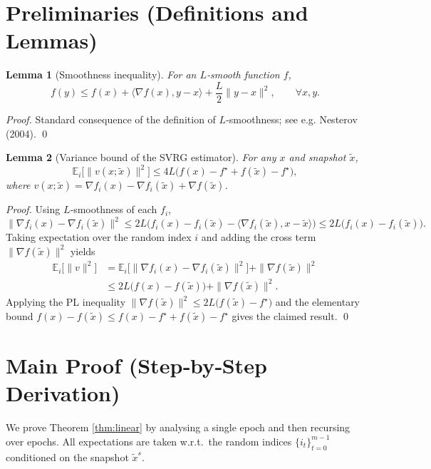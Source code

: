 \documentclass{article}
\newtheorem{lemma}{Lemma}[section]
\begin{document}
\section*{Preliminaries (Definitions and Lemmas)}
\begin{lemma}[Smoothness inequality]\label{lem:smooth}
For an $L$‑smooth function $f$,
\[
f(y)\le f(x)+\langle\nabla f(x),y-x\rangle+\frac{L}{2}\|y-x\|^{2},
\qquad\forall x,y .
\]
\end{lemma}
\begin{proof}
Standard consequence of the definition of $L$‑smoothness; see e.g. Nesterov (2004). \hfill\qed
\end{proof}

\begin{lemma}[Variance bound of the SVRG estimator]\label{lem:var}
For any $x$ and snapshot $\tilde{x}$,
\[
\mathbb{E}_{i}\!\bigl[\|v(x;\tilde{x})\|^{2}\bigr]
\le 4L\bigl(f(x)-f^{\star}+f(\tilde{x})-f^{\star}\bigr),
\]
where $v(x;\tilde{x})=\nabla f_{i}(x)-\nabla f_{i}(\tilde{x})+\nabla f(\tilde{x})$.
\end{lemma}
\begin{proof}
Using $L$‑smoothness of each $f_i$,
\[
\|\nabla f_i(x)-\nabla f_i(\tilde{x})\|^{2}
\le 2L\bigl(f_i(x)-f_i(\tilde{x})-\langle\nabla f_i(\tilde{x}),x-\tilde{x}\rangle\bigr)
\le 2L\bigl(f_i(x)-f_i(\tilde{x})\bigr).
\]
Taking expectation over the random index $i$ and adding the cross term
$\|\nabla f(\tilde{x})\|^{2}$ yields
\[
\begin{aligned}
\mathbb{E}_{i}\!\bigl[\|v\|^{2}\bigr]
&= \mathbb{E}_{i}\!\bigl[\|\nabla f_i(x)-\nabla f_i(\tilde{x})\|^{2}\bigr]
   +\|\nabla f(\tilde{x})\|^{2} \\
&\le 2L\bigl(f(x)-f(\tilde{x})\bigr)+\|\nabla f(\tilde{x})\|^{2}.
\end{aligned}
\]
Applying the PL inequality $\|\nabla f(\tilde{x})\|^{2}\le 2L\bigl(f(\tilde{x})-f^{\star}\bigr)$
and the elementary bound $f(x)-f(\tilde{x})\le f(x)-f^{\star}+f(\tilde{x})-f^{\star}$
gives the claimed result. \hfill\qed
\end{proof}

\section*{Main Proof (Step‑by‑Step Derivation)}
We prove Theorem \ref{thm:linear} by analysing a single epoch and then
recursing over epochs. All expectations are taken w.r.t.\ the random indices
$\{i_t\}_{t=0}^{m-1}$ conditioned on the snapshot $\tilde{x}^{s}$.
\end{document}
